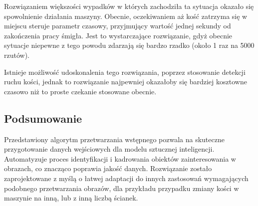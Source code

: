 Rozwiązaniem większości wypadków w których zachodziła ta sytuacja okazało się spowolnienie działania maszyny.
Obecnie, oczekiwaniem aż kość zatrzyma się w miejscu steruje parametr czasowy, przyjmujący wartość jednej sekundy od zakończenia pracy śmigła.
Jest to wystarczające rozwiązanie, gdyż obecnie sytuacje niepewne z tego powodu zdarzają się bardzo rzadko (około 1 raz na 5000 rzutów).

Istnieje możliwość udoskonalenia tego rozwiązania, poprzez stosowanie detekcji ruchu kości,
jednak to rozwiązanie najpewniej okazałoby się bardziej kosztowne czasowo niż to proste czekanie stosowane obecnie.


\subsection{Podsumowanie}\label{subsec:podsumowanie}

Przedstawiony algorytm przetwarzania wstępnego pozwala na skuteczne przygotowanie danych wejściowych dla modelu sztucznej inteligencji.
Automatyzuje proces identyfikacji i kadrowania obiektów zainteresowania w obrazach, co znacząco poprawia jakość danych.
Rozwiązanie zostało zaprojektowane z myślą o łatwej adaptacji do innych zastosowań wymagających podobnego przetwarzania obrazów,
dla przykładu przypadku zmiany kości w maszynie na inną, lub z inną liczbą ścianek.

